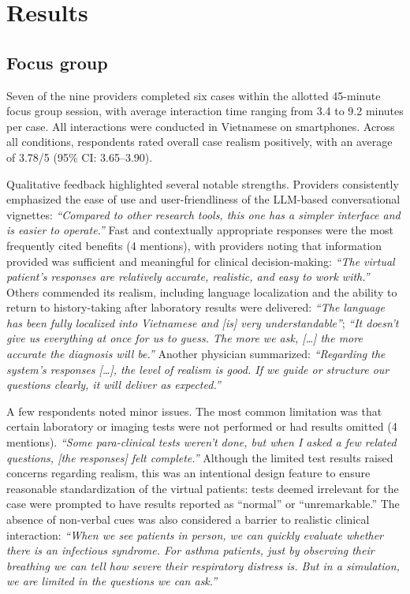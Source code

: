\documentclass{article}
\begin{document}
\section{Results}

\subsection{Focus group}

Seven of the nine providers completed six cases within the allotted 45-minute focus group session, with average interaction time ranging from 3.4 to 9.2 minutes per case. All interactions were conducted in Vietnamese on smartphones. Across all conditions, respondents rated overall case realism positively, with an average of 3.78/5 (95\% CI: 3.65--3.90).

Qualitative feedback highlighted several notable strengths. Providers consistently emphasized the ease of use and user-friendliness of the LLM-based conversational vignettes: \textit{``Compared to other research tools, this one has a simpler interface and is easier to operate.''} Fast and contextually appropriate responses were the most frequently cited benefits (4 mentions), with providers noting that information provided was sufficient and meaningful for clinical decision-making: \textit{``The virtual patient's responses are relatively accurate, realistic, and easy to work with.''} Others commended its realism, including language localization and the ability to return to history-taking after laboratory results were delivered: \textit{``The language has been fully localized into Vietnamese and [is] very understandable''}; \textit{``It doesn't give us everything at once for us to guess. The more we ask, [\ldots] the more accurate the diagnosis will be.''} Another physician summarized: \textit{``Regarding the system's responses [\ldots], the level of realism is good. If we guide or structure our questions clearly, it will deliver as expected.''}

A few respondents noted minor issues. The most common limitation was that certain laboratory or imaging tests were not performed or had results omitted (4 mentions). \textit{``Some para-clinical tests weren't done, but when I asked a few related questions, [the responses] felt complete.''} Although the limited test results raised concerns regarding realism, this was an intentional design feature to ensure reasonable standardization of the virtual patients: tests deemed irrelevant for the case were prompted to have results reported as ``normal'' or ``unremarkable.'' The absence of non-verbal cues was also considered a barrier to realistic clinical interaction: \textit{``When we see patients in person, we can quickly evaluate whether there is an infectious syndrome. For asthma patients, just by observing their breathing we can tell how severe their respiratory distress is. But in a simulation, we are limited in the questions we can ask.''}
\end{document}
